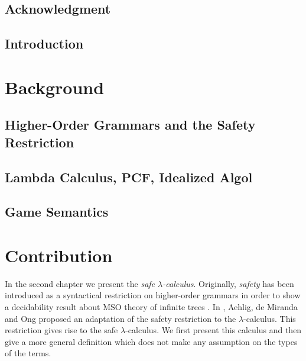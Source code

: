 \begin{romanpages}
\tableofcontents
\listoffigures
\end{romanpages}

    \chapter*{Acknowledgment}

    \chapter{Introduction}
    



\part{Background}
    \chapter{Higher-Order Grammars and the Safety Restriction}
    

    \chapter{Lambda Calculus, PCF, Idealized Algol}
    

    \chapter{Game Semantics}
    



\part{Contribution}


In the second chapter we present the \emph{safe $\lambda$-calculus}.
Originally, \emph{safety} has been introduced as a syntactical
restriction on higher-order grammars in order to show a decidability
result about MSO theory of infinite trees \citep{KNU02}. In
\cite{safety-mirlong2004}, Aehlig, de Miranda and Ong  proposed an
adaptation of the safety restriction to the $\lambda$-calculus. This
restriction gives rise to the safe $\lambda$-calculus. We first
present this calculus and then give a more general definition which
does not make any assumption on the types of the terms.

